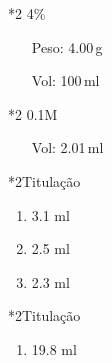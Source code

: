 \begin{sectionBox}*2{ 4\%}
    \begin{itemize}
        \item[Peso:] 4.00\,\unit{\gram{}}
        \item[Vol:]  100\,\unit{\milli\litre{}}
    \end{itemize}
\end{sectionBox}

\begin{sectionBox}*2{ 0.1M}
    \begin{itemize}
        \item[Vol:] 2.01\,\unit{\milli\litre{}}
    \end{itemize}
\end{sectionBox}

\begin{sectionBox}*2{Titulação }
    \begin{enumerate}
        \item 3.1 \unit{\milli\litre{}}
        \item 2.5 \unit{\milli\litre{}}
        \item 2.3 \unit{\milli\litre{}}
    \end{enumerate}
\end{sectionBox}

\begin{sectionBox}*2{Titulação }
    \begin{enumerate}
        \item 19.8 \unit{\milli\litre{}}
    \end{enumerate}
\end{sectionBox}





%
%
%
%
%



